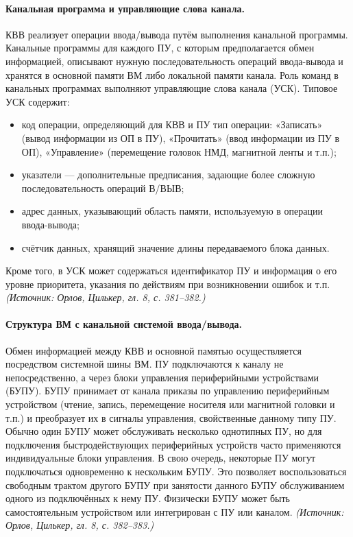 \documentclass[a4paper,12pt]{article}
\begin{document}
\paragraph{Канальная программа и управляющие слова канала.}
КВВ реализует операции ввода/вывода путём выполнения канальной программы. Канальные программы для каждого ПУ, с которым предполагается обмен информацией, описывают нужную последовательность операций ввода-вывода и хранятся в основной памяти ВМ либо локальной памяти канала. Роль команд в канальных программах выполняют управляющие слова канала (УСК). Типовое УСК содержит:
\begin{itemize}
\item код операции, определяющий для КВВ и ПУ тип операции: «Записать» (вывод информации из ОП в ПУ), «Прочитать» (ввод информации из ПУ в ОП), «Управление» (перемещение головок НМД, магнитной ленты и т.п.);
\item указатели — дополнительные предписания, задающие более сложную последовательность операций В/ВЫВ;
\item адрес данных, указывающий область памяти, используемую в операции ввода-вывода;
\item счётчик данных, хранящий значение длины передаваемого блока данных.
\end{itemize}
Кроме того, в УСК может содержаться идентификатор ПУ и информация о его уровне приоритета, указания по действиям при возникновении ошибок и т.п.
\textit{(Источник: Орлов, Цилькер, гл. 8, с. 381--382.)}

\paragraph{Структура ВМ с канальной системой ввода/вывода.}
Обмен информацией между КВВ и основной памятью осуществляется посредством системной шины ВМ. ПУ подключаются к каналу не непосредственно, а через блоки управления периферийными устройствами (БУПУ). БУПУ принимает от канала приказы по управлению периферийным устройством (чтение, запись, перемещение носителя или магнитной головки и т.п.) и преобразует их в сигналы управления, свойственные данному типу ПУ. Обычно один БУПУ может обслуживать несколько однотипных ПУ, но для подключения быстродействующих периферийных устройств часто применяются индивидуальные блоки управления. В свою очередь, некоторые ПУ могут подключаться одновременно к нескольким БУПУ. Это позволяет воспользоваться свободным трактом другого БУПУ при занятости данного БУПУ обслуживанием одного из подключённых к нему ПУ. Физически БУПУ может быть самостоятельным устройством или интегрирован с ПУ или каналом.
\textit{(Источник: Орлов, Цилькер, гл. 8, с. 382--383.)}
\end{document}
